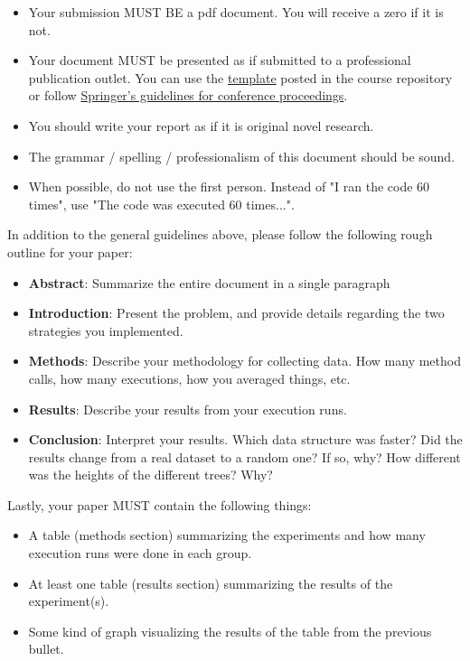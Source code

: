 \documentclass[paper=a4, fontsize=11pt, parskip=full]{scrartcl} %
\numberwithin{equation}{section} %
\numberwithin{figure}{section} %
\numberwithin{table}{section} %
\begin{document}
\begin{itemize}
	\item Your submission MUST BE a pdf document. You will receive a zero if it is not.
	\item Your document MUST be presented as if submitted to a professional publication outlet. You can use the \href{https://markfloryan.github.io/dsa1/labs/WordPaperTemplate.zip}{template} posted in the course repository or follow \href{https://www.springer.com/us/computer-science/lncs/conference-proceedings-guidelines}{Springer's guidelines for conference proceedings}.
	\item You should write your report as if it is original novel research.
	\item The grammar / spelling / professionalism of this document should be sound.
	\item When possible, do not use the first person. Instead of "I ran the code 60 times", use "The code was executed 60 times...".
\end{itemize}

In addition to the general guidelines above, please follow the following rough outline for your paper:

\begin{itemize}
	\item \textbf{Abstract}: Summarize the entire document in a single paragraph
	\item \textbf{Introduction}: Present the problem, and provide details regarding the two strategies you implemented.
	\item \textbf{Methods}: Describe your methodology for collecting data. How many method calls, how many executions, how you averaged things, etc.
	\item \textbf{Results}: Describe your results from your execution runs.
	\item \textbf{Conclusion}: Interpret your results. Which data structure was faster? Did the results change from a real dataset to a random one? If so, why? How different was the heights of the different trees? Why?
\end{itemize}

Lastly, your paper MUST contain the following things:

\begin{itemize}
	\item A table (methods section) summarizing the experiments and how many execution runs were done in each group.
	\item At least one table (results section) summarizing the results of the experiment(s).
	\item Some kind of graph visualizing the results of the table from the previous bullet.
\end{itemize}


\end{document}
